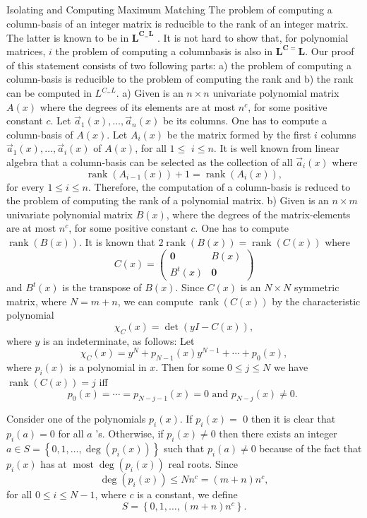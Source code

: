 \documentclass{beamer}
\begin{document}
\begin{frame}[allowframebreaks]{Isolating and Computing Maximum Matching}
	The problem of computing a column-basis of an integer matrix  is reducible to the rank of an integer matrix. The latter is known to be in $\mathbf{L}^{\mathbf{C}_{=} \mathbf{L}}$ . It is not hard to show that, for polynomial matrices, $i$ the problem of computing a columnbasis is also in $\mathbf{L}^{\mathbf{C}=} \mathbf{L}$. Our proof of this statement consists of two following parts: a) the problem of 
	computing a column-basis is reducible to the problem of computing the rank and b) the rank can be computed in $L^{C_=L}$.
	a) Given is an $n \times n$ univariate polynomial matrix $A(x)$ where the degrees of its elements are at most $n^c$, for some positive constant $c$. Let $\vec{a}_1(x), \ldots, \vec{a}_n(x)$ be its columns. One has to compute a column-basis of $A(x)$.
	Let $A_i(x)$ be the matrix formed by the first $i$ columns $\vec{a}_1(x), \ldots, \vec{a}_i(x)$ of $A(x)$, for all $1 \leq$ $i \leq n$. It is well known from linear algebra that a column-basis can be selected as the collection of all $\vec{a}_i(x)$ where
	$$
	\operatorname{rank}\left(A_{i-1}(x)\right)+1=\operatorname{rank}\left(A_i(x)\right),
	$$
	for every $1 \leq i \leq n$. Therefore, the computation of a column-basis is reduced to the problem of computing the rank of a polynomial matrix.
	b) Given is an $n \times m$ univariate polynomial matrix $B(x)$, where the degrees of the matrix-elements are at most $n^c$, for some positive constant $c$. One has to compute $\operatorname{rank}(B(x))$.
	It is known that $2 \operatorname{rank}(B(x))=\operatorname{rank}(C(x))$ where
	$$
	C(x)=\left(\begin{array}{cc}
		\mathbf{0} & B(x) \\
		B^t(x) & \mathbf{0}
	\end{array}\right)
	$$
	and $B^t(x)$ is the transpose of $B(x)$. Since $C(x)$ is an $N \times N$ symmetric matrix, where $N=m+n$, we can compute $\operatorname{rank}(C(x))$ by the characteristic polynomial
	$$
	\chi_C(x)=\operatorname{det}(y I-C(x)),
	$$
	where $y$ is an indeterminate, as follows: Let
	$$
	\chi_C(x)=y^N+p_{N-1}(x) y^{N-1}+\cdots+p_0(x),
	$$
	where $p_i(x)$ is a polynomial in $x$. Then for some $0 \leq j \leq N$ we have $\operatorname{rank}(C(x))=j$ iff
	$$
	p_0(x)=\cdots=p_{N-j-1}(x)=0 \text { and } p_{N-j}(x) \neq 0 \text {. }
	$$
	
	Consider one of the polynomials $p_i(x)$. If $p_i(x)=$ 0 then it is clear that $p_i(a)=0$ for all $a$ 's. Otherwise, if $p_i(x) \neq 0$ then there exists an integer $a \in S=\left\{0,1, \ldots, \operatorname{deg}\left(p_i(x)\right)\right\}$ such that $p_i(a) \neq 0$ because of the fact that $p_i(x)$ has at $\operatorname{most} \operatorname{deg}\left(p_i(x)\right)$ real roots. Since
	$$
	\operatorname{deg}\left(p_i(x)\right) \leq N n^c=(m+n) n^c,
	$$
	for all $0 \leq i \leq N-1$, where $c$ is a constant, we define
	$$
	S=\left\{0,1, \ldots,(m+n) n^c\right\} .
	$$
	

\end{frame}
\end{document}
